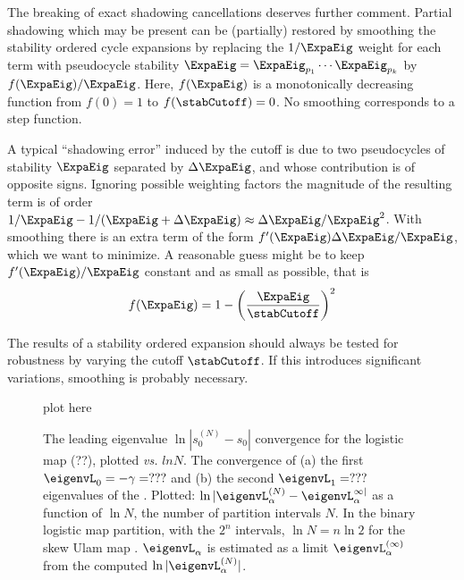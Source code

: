 The breaking of exact shadowing cancellations deserves further comment.
Partial shadowing which may be present can be (partially) restored by smoothing
the stability ordered cycle expansions by replacing the
$1/\ExpaEig$ weight for each term with
pseudocycle stability
$\ExpaEig=
\ExpaEig_{p_1}\cdots\ExpaEig_{p_k}$ by $f(\ExpaEig)/\ExpaEig$.
Here, $f(\ExpaEig)$ is a monotonically decreasing function from $f(0)=1$ to
$f(\stabCutoff)=0$.  No smoothing corresponds to a step function.

A typical ``shadowing error'' induced by the cutoff is due to two
pseudocycles of stability $\ExpaEig$ separated by $\Delta\ExpaEig$, and
whose contribution is of opposite signs.
Ignoring possible weighting factors the magnitude of the resulting term
is of order
$1/\ExpaEig-1/(\ExpaEig+\Delta\ExpaEig)
\approx\Delta\ExpaEig/\ExpaEig^2$.
With smoothing there is an
extra term of the form $f'(\ExpaEig)\Delta\ExpaEig/\ExpaEig$, which we
want to minimize.  A reasonable guess might be to keep $f'(\ExpaEig)/\ExpaEig$
constant and as small as possible, that is
\[
f(\ExpaEig)=1-\left(\frac{\ExpaEig}{\stabCutoff}\right)^2
\]

The results of a stability ordered expansion
should always be tested for
robustness by varying the cutoff  $\stabCutoff$.
If this introduces significant variations,
smoothing is probably necessary.

\begin{figure} \label{fig:logStabOrder1}
\begin{center}
plot here %
\end{center}
\caption[The leading eigenvalue convergence for the logistic map]
        {
The leading eigenvalue $\ln | s_0^{(N)} - s_0|$
convergence for the
logistic map (??), plotted {\em vs.} $ln N$.
The convergence of
(a)  the first $\eigenvL_0 = - \gamma = ???$
and
(b)  the second $\eigenvL_1 = ???$ eigenvalues
of the
\FP. Plotted:
$\ln |\eigenvL_\alpha^{(N)}-\eigenvL_\alpha^{\infty|}$
as a function of $\ln N$,
the number of partition intervals $N$.
In the binary
logistic map partition, with the $2^n$ intervals,
$\ln N= n \ln 2$ for the skew Ulam map .
$\eigenvL_\alpha$ is estimated as a limit
$\eigenvL_\alpha^{(\infty)}$ from the computed
$\ln |\eigenvL_\alpha^{(N)}|$.
        }
\end{figure}


